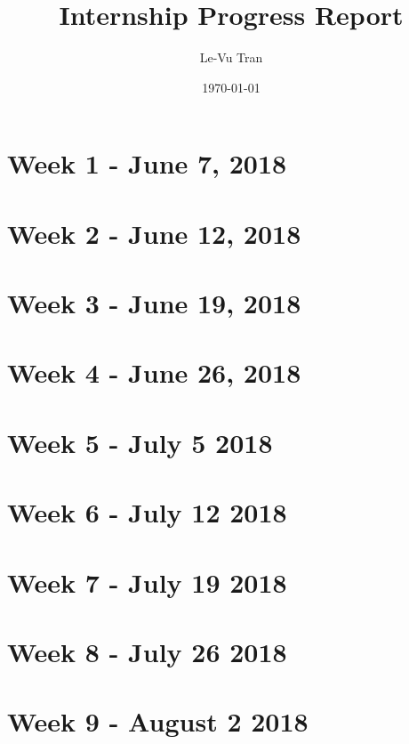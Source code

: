 \documentclass[a4paper]{report}
\title{Internship Progress Report}
\author{Le-Vu Tran}
\date{\today}
\begin{document}
\maketitle

\tableofcontents

\iffalse

\chapter{Week 1 - June 7, 2018}


\chapter{Week 2 - June 12, 2018}


\chapter{Week 3 - June 19, 2018}


\chapter{Week 4 - June 26, 2018}


\chapter{Week 5 - July 5 2018}


\chapter{Week 6 - July 12 2018}


\chapter{Week 7 - July 19 2018}


\chapter{Week 8 - July 26 2018}


\chapter{Week 9 - August 2 2018}

\end{document}
